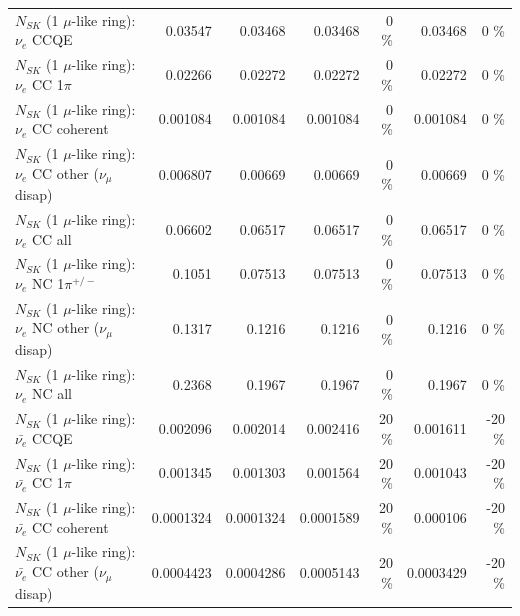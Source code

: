 \begin{table}
\begin{tabular}{| l | r | r | r  r | r  r |}
\hline
\hline
\hline
                                      $N_{SK}$ (1 $\mu$-like ring): $\nu_e$ CCQE &         0.03547 &         0.03468 &         0.03468 &        0 \%  &         0.03468 &        0 \%  \\ 
                                 $N_{SK}$ (1 $\mu$-like ring): $\nu_e$ CC 1$\pi$ &         0.02266 &         0.02272 &         0.02272 &        0 \%  &         0.02272 &        0 \%  \\ 
                               $N_{SK}$ (1 $\mu$-like ring): $\nu_e$ CC coherent &        0.001084 &        0.001084 &        0.001084 &        0 \%  &        0.001084 &        0 \%  \\ 
                $N_{SK}$ (1 $\mu$-like ring): $\nu_e$ CC other ($\nu_\mu$ disap) &        0.006807 &         0.00669 &         0.00669 &        0 \%  &         0.00669 &        0 \%  \\ 
                                  $N_{SK}$ (1 $\mu$-like ring): $\nu_{e}$ CC all &         0.06602 &         0.06517 &         0.06517 &        0 \%  &         0.06517 &        0 \%  \\ 
\hline
                           $N_{SK}$ (1 $\mu$-like ring): $\nu_e$ NC 1$\pi^{+/-}$ &          0.1051 &         0.07513 &         0.07513 &        0 \%  &         0.07513 &        0 \%  \\ 
                $N_{SK}$ (1 $\mu$-like ring): $\nu_e$ NC other ($\nu_\mu$ disap) &          0.1317 &          0.1216 &          0.1216 &        0 \%  &          0.1216 &        0 \%  \\ 
                                  $N_{SK}$ (1 $\mu$-like ring): $\nu_{e}$ NC all &          0.2368 &          0.1967 &          0.1967 &        0 \%  &          0.1967 &        0 \%  \\ 
\hline
\hline
\hline
                                $N_{SK}$ (1 $\mu$-like ring): $\bar{\nu_e}$ CCQE &        0.002096 &        0.002014 &        0.002416 &       20 \%  &        0.001611 &      -20 \%  \\ 
                           $N_{SK}$ (1 $\mu$-like ring): $\bar{\nu_e}$ CC 1$\pi$ &        0.001345 &        0.001303 &        0.001564 &       20 \%  &        0.001043 &      -20 \%  \\ 
                         $N_{SK}$ (1 $\mu$-like ring): $\bar{\nu_e}$ CC coherent &       0.0001324 &       0.0001324 &       0.0001589 &       20 \%  &        0.000106 &      -20 \%  \\ 
          $N_{SK}$ (1 $\mu$-like ring): $\bar{\nu_e}$ CC other ($\nu_\mu$ disap) &       0.0004423 &       0.0004286 &       0.0005143 &       20 \%  &       0.0003429 &      -20 \%  \\ 

\end{tabular}
\end{table}
